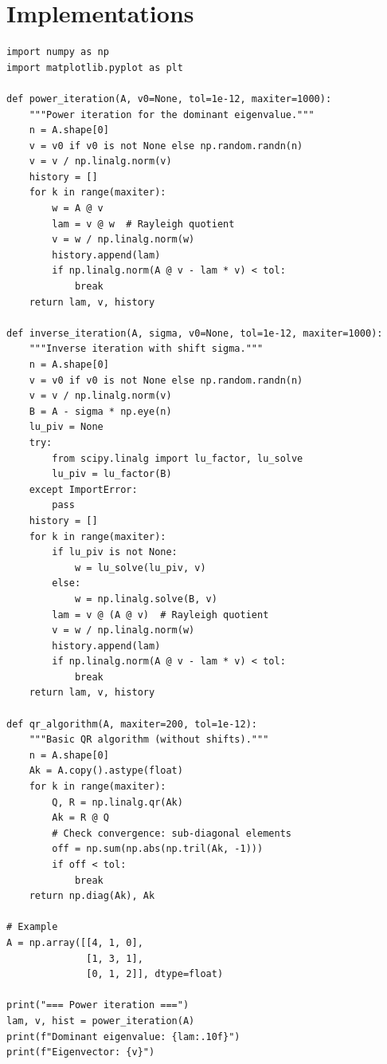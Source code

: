 \section{Implementations}

\begin{codeblock}[title=\textbf{Python --- Eigenvalue algorithms}]
\begin{verbatim}
import numpy as np
import matplotlib.pyplot as plt

def power_iteration(A, v0=None, tol=1e-12, maxiter=1000):
    """Power iteration for the dominant eigenvalue."""
    n = A.shape[0]
    v = v0 if v0 is not None else np.random.randn(n)
    v = v / np.linalg.norm(v)
    history = []
    for k in range(maxiter):
        w = A @ v
        lam = v @ w  # Rayleigh quotient
        v = w / np.linalg.norm(w)
        history.append(lam)
        if np.linalg.norm(A @ v - lam * v) < tol:
            break
    return lam, v, history

def inverse_iteration(A, sigma, v0=None, tol=1e-12, maxiter=1000):
    """Inverse iteration with shift sigma."""
    n = A.shape[0]
    v = v0 if v0 is not None else np.random.randn(n)
    v = v / np.linalg.norm(v)
    B = A - sigma * np.eye(n)
    lu_piv = None
    try:
        from scipy.linalg import lu_factor, lu_solve
        lu_piv = lu_factor(B)
    except ImportError:
        pass
    history = []
    for k in range(maxiter):
        if lu_piv is not None:
            w = lu_solve(lu_piv, v)
        else:
            w = np.linalg.solve(B, v)
        lam = v @ (A @ v)  # Rayleigh quotient
        v = w / np.linalg.norm(w)
        history.append(lam)
        if np.linalg.norm(A @ v - lam * v) < tol:
            break
    return lam, v, history

def qr_algorithm(A, maxiter=200, tol=1e-12):
    """Basic QR algorithm (without shifts)."""
    n = A.shape[0]
    Ak = A.copy().astype(float)
    for k in range(maxiter):
        Q, R = np.linalg.qr(Ak)
        Ak = R @ Q
        # Check convergence: sub-diagonal elements
        off = np.sum(np.abs(np.tril(Ak, -1)))
        if off < tol:
            break
    return np.diag(Ak), Ak

# Example
A = np.array([[4, 1, 0],
              [1, 3, 1],
              [0, 1, 2]], dtype=float)

print("=== Power iteration ===")
lam, v, hist = power_iteration(A)
print(f"Dominant eigenvalue: {lam:.10f}")
print(f"Eigenvector: {v}")


\end{verbatim}
\end{codeblock}
